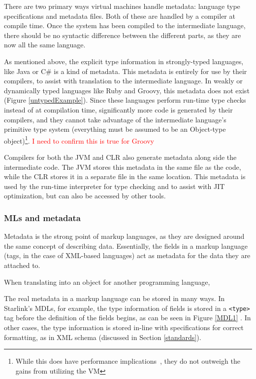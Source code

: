 \documentclass{sig-alternate}
\newcommand{\mycomment}[1]{\textcolor{red}{#1}}
\begin{document}
There are two primary ways virtual machines handle metadata: language type specifications and metadata files. Both of these are handled by a compiler at compile time.
Once the system has been compiled to the intermediate language, there should be no syntactic difference between the different parts, as they are now all the same language.

As mentioned above, the explicit type information in strongly-typed languages, like Java or C\# is a kind of metadata. This metadata is entirely for use by their compilers, to assist with translation to the intermediate language.
In weakly or dynamically typed languages like Ruby and Groovy, this metadata does not exist (Figure \ref{untypedExample}). Since these languages perform run-time type checks instead of at compilation time, significantly more code is generated by their compilers, and they cannot take advantage of the intermediate language's primitive type system (everything must be assumed to be an Object-type object)\footnote{While this does have performance implications~\cite{Li:2013}, they do not outweigh the gains from utilizing the VM}.
\mycomment{I need to confirm this is true for Groovy}

Compilers for both the JVM and CLR also generate metadata along side the intermediate code. The JVM stores this metadata in the same file as the code, while the CLR stores it in a separate file in the same location. This metadata is used by the run-time interpreter for type checking and to assist with JIT optimization, but can also be accessed by other tools. 

\subsubsection*{MLs and metadata}
Metadata is the strong point of markup languages, as they are designed around the same concept of describing data. Essentially, the fields in a markup language (tags, in the case of XML-based languages) act as metadata for the data they are attached to.

When translating into an object for another programming language, 

The real metadata in a markup language can be stored in many ways. In Starlink's MDLs, for example, the type information of fields is stored in a {\tt <type>} tag before the definition of the fields begins, as can be seen in Figure \ref{MDL1} \cite{Bromberg:2011}. In other cases, the type information is stored in-line with specifications for correct formatting, as in XML schema (discussed in Section \ref{standards}).
\end{document}
